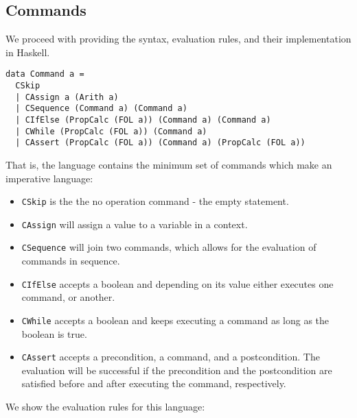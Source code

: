 \documentclass{article}
\begin{document}
\subsection{Commands}

We proceed with providing the syntax, evaluation rules, and their implementation in Haskell.

\begin{lstlisting}
data Command a =
  CSkip
  | CAssign a (Arith a)
  | CSequence (Command a) (Command a)
  | CIfElse (PropCalc (FOL a)) (Command a) (Command a)
  | CWhile (PropCalc (FOL a)) (Command a)
  | CAssert (PropCalc (FOL a)) (Command a) (PropCalc (FOL a))
\end{lstlisting}

That is, the language contains the minimum set of commands which make an imperative language:

\begin{itemize}
\item \texttt{CSkip} is the the no operation command - the empty statement.
\item \texttt{CAssign} will assign a value to a variable in a context.
\item \texttt{CSequence} will join two commands, which allows for the evaluation of commands in sequence.
\item \texttt{CIfElse} accepts a boolean and depending on its value either executes one command, or another.
\item \texttt{CWhile} accepts a boolean and keeps executing a command as long as the boolean is true.
\item \texttt{CAssert} accepts a precondition, a command, and a postcondition. The evaluation will be successful if the precondition and the postcondition are satisfied before and after executing the command, respectively.
\end{itemize}

We show the evaluation rules for this language:
\end{document}
